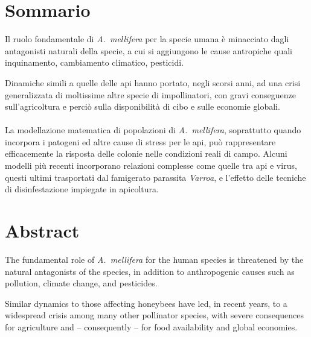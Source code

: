 \section*{Sommario}
Il ruolo fondamentale di \emph{A.~mellifera} per la specie umana è minacciato dagli antagonisti naturali della
specie, a cui si aggiungono le cause antropiche quali inquinamento, cambiamento climatico, pesticidi.

Dinamiche simili a quelle delle api hanno portato, negli scorsi anni, ad una crisi generalizzata di
moltissime altre specie di impollinatori, con gravi conseguenze sull'agricoltura e perciò sulla disponibilità di cibo
e sulle economie globali.

\paragraph{}
La modellazione matematica di popolazioni di \emph{A.~mellifera}, soprattutto quando incorpora i patogeni ed
altre cause di stress per le api, può rappresentare efficacemente la risposta delle colonie nelle condizioni
reali di campo.
Alcuni modelli più recenti incorporano relazioni complesse come quelle tra api e virus, questi
ultimi trasportati dal famigerato parassita \emph{Varroa}, e l'effetto delle tecniche di disinfestazione
impiegate in apicoltura.

%

\vspace{1cm}
\section*{Abstract}
The fundamental role of \emph{A.~mellifera} for the human species is threatened by the natural antagonists of
the species, in addition to anthropogenic causes such as pollution, climate change, and pesticides.

Similar dynamics to those affecting honeybees have led, in recent years, to a widespread crisis
among many other pollinator species,
with severe consequences for agriculture and -- consequently -- for food availability and global economies.

